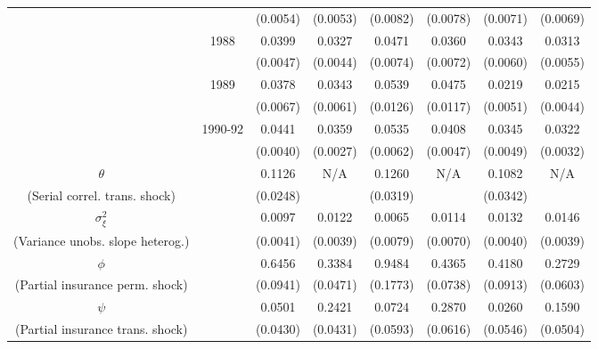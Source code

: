 \begin{table}
\begin{center}
\begin{tabular}{cccc|cc|cc}
\\  &                    & (0.0054) & (0.0053)  & (0.0082) & (0.0078)  & (0.0071) & (0.0069) 
\\  & 1988 & 0.0399 &   0.0327 & 0.0471 &   0.0360 & 0.0343 &   0.0313
\\  &                    & (0.0047) & (0.0044)  & (0.0074) & (0.0072)  & (0.0060) & (0.0055) 
\\  & 1989 & 0.0378 &   0.0343 & 0.0539 &   0.0475 & 0.0219 &   0.0215
\\  &                    & (0.0067) & (0.0061)  & (0.0126) & (0.0117)  & (0.0051) & (0.0044) 
\\  & 1990-92 & 0.0441 &   0.0359 & 0.0535 &   0.0408 & 0.0345 &   0.0322 
\\  &         & (0.0040) & (0.0027) & (0.0062) & (0.0047) & (0.0049) & (0.0032) 
\\ \hline  
 $\theta$ &     & 0.1126 &   N/A & 0.1260 &   N/A & 0.1082 &   N/A 
\\ (Serial correl. trans. shock) &     & (0.0248) &  & (0.0319) &  & (0.0342) &  
\\ $\sigma^2_{\xi}$ &     & 0.0097 &   0.0122 & 0.0065 &   0.0114 & 0.0132 &   0.0146 
\\ (Variance unobs. slope heterog.) &     & (0.0041) & (0.0039) & (0.0079) & (0.0070) & (0.0040) & (0.0039) 
\\ \hline  
 $\phi$ &     & 0.6456 &   0.3384 & 0.9484 &   0.4365 & 0.4180 &   0.2729 
\\ (Partial insurance perm. shock) &     & (0.0941) & (0.0471) & (0.1773) & (0.0738) & (0.0913) & (0.0603) 
\\ $\psi$ &     & 0.0501 &   0.2421 & 0.0724 &   0.2870 & 0.0260 &   0.1590 
\\ (Partial insurance trans. shock) &     & (0.0430) & (0.0431) & (0.0593) & (0.0616) & (0.0546) & (0.0504) 
\\ \hline  
 \end{tabular}    
\end{center}  
\end{table}  
